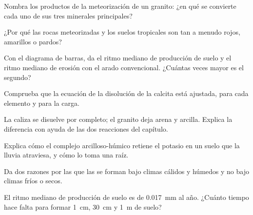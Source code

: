 \begin{exercise}[$\star$]\label{exo:g10:soil-formation:3}
Nombra los productos de la meteorización de un granito: ¿en qué se convierte
cada uno de sus tres minerales principales?
\end{exercise}

\begin{exercise}[$\star$]\label{exo:g10:soil-formation:4}
¿Por qué las rocas meteorizadas y los suelos tropicales son tan a menudo
rojos, amarillos o pardos?
\end{exercise}

\begin{exercise}[$\star$]\label{exo:g10:soil-formation:5}
Con el diagrama de barras, da el ritmo mediano de producción de suelo y el
ritmo mediano de erosión con el arado convencional. ¿Cuántas veces mayor es
el segundo?
\end{exercise}

\begin{exercise}[$\star\star$]\label{exo:g10:soil-formation:6}
Comprueba que la ecuación de la disolución de la calcita está ajustada, para
cada elemento y para la carga.
\end{exercise}

\begin{exercise}[$\star\star$]\label{exo:g10:soil-formation:7}
La caliza se disuelve por completo; el granito deja arena y arcilla. Explica
la diferencia con ayuda de las dos reacciones del capítulo.
\end{exercise}

\begin{exercise}[$\star\star$]\label{exo:g10:soil-formation:8}
Explica cómo el complejo arcilloso-húmico retiene el potasio en un suelo que
la lluvia atraviesa, y cómo lo toma una raíz.
\end{exercise}

\begin{exercise}[$\star\star$]\label{exo:g10:soil-formation:9}
Da dos razones por las que las  se forman bajo climas cálidos y
húmedos y no bajo climas fríos o secos.
\end{exercise}

\begin{exercise}[$\star\star$]\label{exo:g10:soil-formation:10}
El ritmo mediano de producción de suelo es de \qty{0.017}{mm} al año. ¿Cuánto
tiempo hace falta para formar \qty{1}{cm}, \qty{30}{cm} y \qty{1}{m} de suelo?
\end{exercise}

